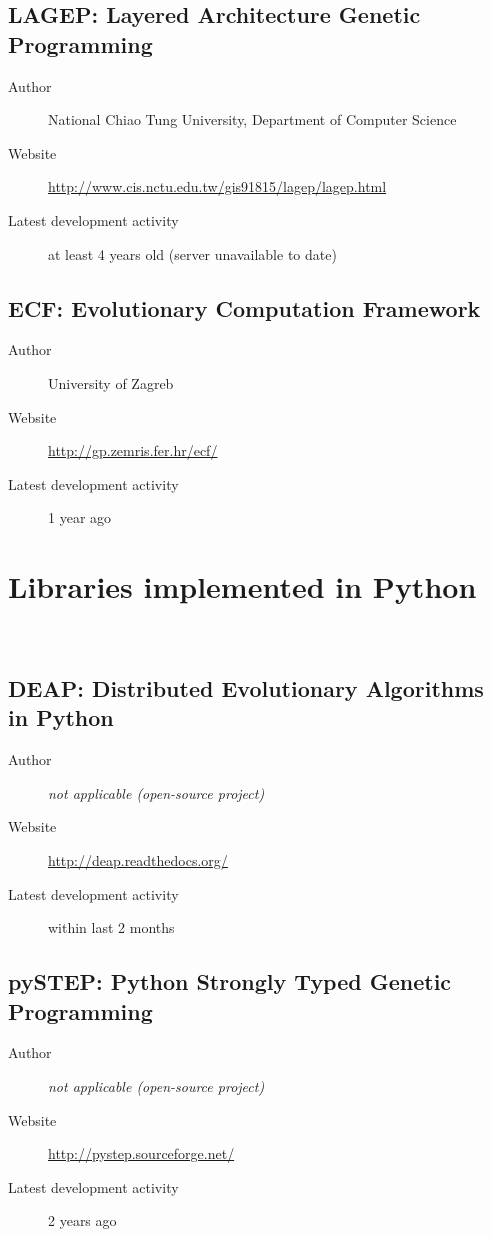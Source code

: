\subsection*{LAGEP: Layered Architecture Genetic Programming}
\begin{description}
    \item[Author] National Chiao Tung University, Department of Computer Science
    \item[Website] \url{http://www.cis.nctu.edu.tw/gis91815/lagep/lagep.html}
    \item[Latest development activity] at least 4 years old (server unavailable to date)
\end{description}


\subsection*{ECF: Evolutionary Computation Framework}
\begin{description}
    \item[Author] University of Zagreb
    \item[Website] \url{http://gp.zemris.fer.hr/ecf/}
    \item[Latest development activity] 1 year ago
\end{description}


\section{Libraries implemented in Python}~\label{section:libraries-python}
\subsection*{DEAP: Distributed Evolutionary Algorithms in Python}
\begin{description}
    \item[Author] \textit{not applicable (open-source project)}
    \item[Website] \url{http://deap.readthedocs.org/}
    \item[Latest development activity] within last 2 months
\end{description}


\subsection*{pySTEP: Python Strongly Typed Genetic Programming}
\begin{description}
    \item[Author] \textit{not applicable (open-source project)}
    \item[Website] \url{http://pystep.sourceforge.net/}
    \item[Latest development activity] 2 years ago
\end{description}


